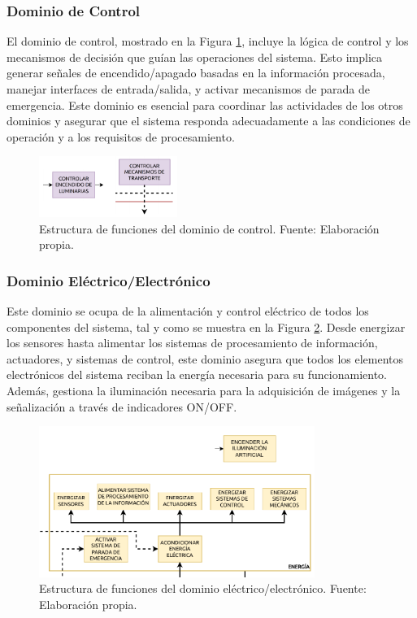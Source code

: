 \subsubsection{Dominio de Control}

El dominio de control, mostrado en la Figura \ref{fig:EF_DC}, incluye la lógica de control y los mecanismos de decisión que guían las operaciones del sistema. Esto implica generar señales de encendido/apagado basadas en la información procesada, manejar interfaces de entrada/salida, y activar mecanismos de parada de emergencia. Este dominio es esencial para coordinar las actividades de los otros dominios y asegurar que el sistema responda adecuadamente a las condiciones de operación y a los requisitos de procesamiento.

\begin{figure}[h]
	\centering
	\includegraphics[width=0.4\textwidth]{img/EF_DC.pdf}
	\caption[Estructura de funciones del dominio de control.]{Estructura de funciones del dominio de control. Fuente: Elaboración propia.}
	\label{fig:EF_DC}
\end{figure}

\subsubsection{Dominio Eléctrico/Electrónico}

Este dominio se ocupa de la alimentación y control eléctrico de todos los componentes del sistema, tal y como se muestra en la Figura \ref{fig:EF_DEE}. Desde energizar los sensores hasta alimentar los sistemas de procesamiento de información, actuadores, y sistemas de control, este dominio asegura que todos los elementos electrónicos del sistema reciban la energía necesaria para su funcionamiento. Además, gestiona la iluminación necesaria para la adquisición de imágenes y la señalización a través de indicadores ON/OFF.

\begin{figure}[h]
	\centering
	\includegraphics[width=0.8\textwidth]{img/EF_DEE.pdf}
	\caption[Estructura de funciones del dominio eléctrico/electrónico.]{Estructura de funciones del dominio eléctrico/electrónico. Fuente: Elaboración propia.}
	\label{fig:EF_DEE}
\end{figure}


